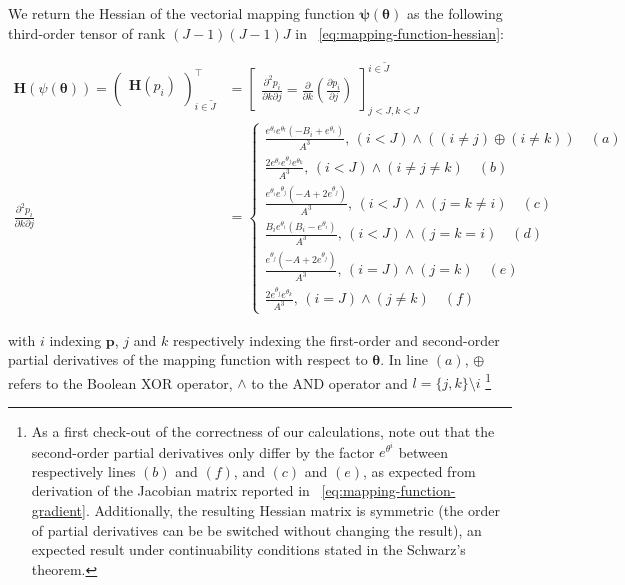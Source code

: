 \documentclass[long, final]{jobim}
\begin{document}
We return the Hessian of the vectorial mapping function $\boldsymbol{\psi (\theta)}$ as the following third-order tensor of rank $(J-1)(J-1)J$ in \equationname~\ref{eq:mapping-function-hessian}:


\begin{equation}
    \label{eq:mapping-function-hessian}
    \begin{aligned}
    \mathbf{H} (\psi(\boldsymbol{\theta})) =
\begin{pmatrix}
 \mathbf{H} (p_i)\\
\end{pmatrix}_{i \in \widetilde{J} }^\top &=
\begin{bmatrix}
\frac{\partial^2 p_i}{\partial k \partial j} = \frac{\partial}{\partial k} \left( \frac{\partial p_i}{\partial j}\right)
\end{bmatrix}_{j < J, k < J}^{i \in \widetilde{J}}\\
   \frac{\partial^2 p_i}{\partial k \partial j} &=
\begin{cases}
\frac{e^{\theta_i} e^{\theta_l} \left (-B_i + e^{\theta_i}\right)}{A^3},\, (i<J) \land \left((i\neq j) \oplus(i\neq k)\right) \quad (a)\\
\frac{2 e^{\theta_i} e^{\theta_j} e^{\theta_k} }{A^3}, \, (i<J) \land  (i \neq j \neq k)  \quad (b)\\
\frac{e^{\theta_i} e^{\theta_j} \left (-A + 2e^{\theta_j}\right)}{A^3}, \, (i<J) \land (j=k\neq i)  \quad (c)\\
\frac{B_i e^{\theta_i} \left( B_i -  e^{\theta_i}\right)}{A^3}, \, (i<J) \land (j = k = i)  \quad (d)\\
\frac{e^{\theta_j} \left( -A + 2 e^{\theta_j}\right)}{A^3}, \, (i=J) \land (j = k)  \quad (e)\\
\frac{2 e^{\theta_j} e^{\theta_k}}{A^3}, \, (i=J) \land (j \neq k)  \quad (f)
\end{cases}
  \end{aligned}
\end{equation}


with $i$ indexing $\boldsymbol{p}$, $j$ and $k$ respectively indexing the first-order and second-order partial derivatives of the mapping function with respect to $\boldsymbol{\theta}$. In line $(a)$, $\oplus$ refers to the Boolean XOR operator, $\land$ to the AND operator and $l=\{j,k\} \setminus i$ \footnote{As a first check-out of the correctness of our calculations, note out that the second-order partial derivatives only differ by the factor $e^{\theta^i}$ between respectively lines $(b)$ and $(f)$, and $(c)$ and $(e)$, as expected from derivation of the Jacobian matrix reported in \equationname~\ref{eq:mapping-function-gradient}. Additionally, the resulting Hessian matrix is symmetric (the order of partial derivatives can be be switched without changing the result), an expected result under continuability conditions stated in the Schwarz's theorem.}
\end{document}
